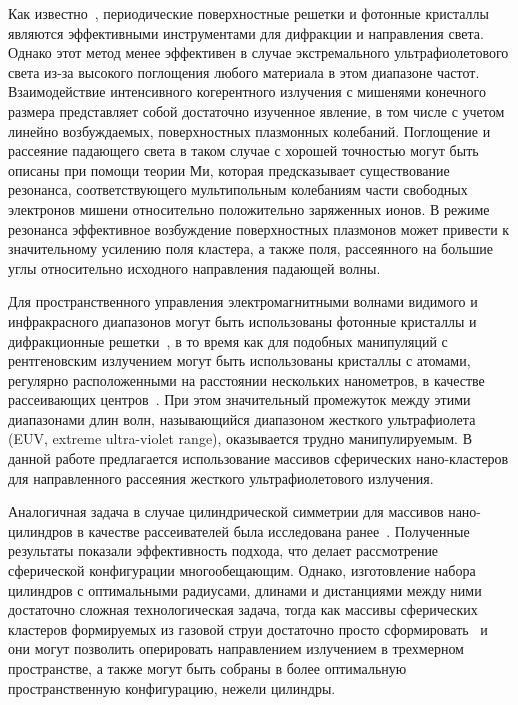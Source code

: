 Как известно~\cite{lin_zhang, batterman_cole}, периодические поверхностные решетки и фотонные кристаллы являются эффективными инструментами для дифракции и направления света. Однако этот метод менее эффективен в случае экстремального ультрафиолетового света из-за высокого поглощения любого материала в этом диапазоне частот. Взаимодействие интенсивного когерентного излучения с мишенями конечного размера представляет собой достаточно изученное явление, в том числе с учетом линейно возбуждаемых, поверхностных плазмонных колебаний. Поглощение и рассеяние падающего света в таком случае с хорошей точностью могут быть описаны при помощи теории Ми, которая предсказывает существование резонанса, соответствующего мультипольным колебаниям части свободных электронов мишени относительно положительно заряженных ионов. В режиме резонанса эффективное возбуждение поверхностных плазмонов может привести к значительному усилению поля кластера, а также поля, рассеянного на большие углы относительно исходного направления падающей волны. 

Для пространственного управления электромагнитными волнами видимого и инфракрасного диапазонов могут быть использованы фотонные кристаллы и дифракционные решетки~\cite{lin_zhang}, в то время как для подобных манипуляций с рентгеновским излучением могут быть использованы кристаллы с атомами, регулярно расположенными на расстоянии нескольких нанометров, в качестве рассеивающих центров~\cite{batterman_cole}. При этом значительный промежуток между этими диапазонами длин волн, называющийся диапазоном жесткого ультрафиолета (EUV, extreme ultra-violet range), оказывается трудно манипулируемым. В данной работе предлагается использование массивов сферических нано-кластеров для направленного рассеяния жесткого ультрафиолетового излучения. 

Аналогичная задача в случае цилиндрической симметрии для массивов нано-цилиндров в качестве рассеивателей была исследована ранее~\cite{andreev_lecz}. Полученные результаты показали эффективность подхода, что делает рассмотрение сферической конфигурации многообещающим. Однако, изготовление набора цилиндров с оптимальными радиусами, длинами и дистанциями между ними достаточно сложная технологическая задача, тогда как массивы сферических кластеров формируемых из газовой струи достаточно просто сформировать~\cite{Krainov2000} и они могут позволить оперировать направлением излучением в трехмерном пространстве, а также могут быть собраны в более оптимальную пространственную конфигурацию, нежели цилиндры.


